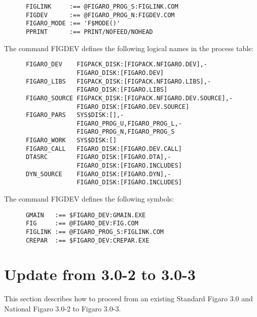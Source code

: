 \begin{verbatim}
      FIGLINK     :== @FIGARO_PROG_S:FIGLINK.COM
      FIGDEV      :== @FIGARO_PROG_N:FIGDEV.COM
      FIGARO_MODE :== 'F$MODE()'
      PPRINT      :== PRINT/NOFEED/NOHEAD
\end{verbatim}

The command FIGDEV defines the following logical names in the process table:

\begin{verbatim}
      FIGARO_DEV    FIGPACK_DISK:[FIGPACK.NFIGARO.DEV],-
                    FIGARO_DISK:[FIGARO.DEV]
      FIGARO_LIBS   FIGPACK_DISK:[FIGPACK.NFIGARO.LIBS],-
                    FIGARO_DISK:[FIGARO.LIBS]
      FIGARO_SOURCE FIGPACK_DISK:[FIGPACK.NFIGARO.DEV.SOURCE],-
                    FIGARO_DISK:[FIGARO.DEV.SOURCE]
      FIGARO_PARS   SYS$DISK:[],-
                    FIGARO_PROG_U,FIGARO_PROG_L,-
                    FIGARO_PROG_N,FIGARO_PROG_S
      FIGARO_WORK   SYS$DISK:[]
      FIGARO_CALL   FIGARO_DISK:[FIGARO.DEV.CALL]
      DTASRC        FIGARO_DISK:[FIGARO.DTA],-
                    FIGARO_DISK:[FIGARO.INCLUDES]
      DYN_SOURCE    FIGARO_DISK:[FIGARO.DYN],-
                    FIGARO_DISK:[FIGARO.INCLUDES]
\end{verbatim}

The command FIGDEV defines the following symbols:

\begin{verbatim}
      GMAIN   :== $FIGARO_DEV:GMAIN.EXE
      FIG     :== @FIGARO_DEV:FIG.COM
      FIGLINK :== @FIGARO_PROG_S:FIGLINK.COM
      CREPAR  :== $FIGARO_DEV:CREPAR.EXE
\end{verbatim}

\section{Update from 3.0-2 to 3.0-3}
\label{update}

This section describes how to proceed from an existing Standard
Figaro 3.0 and National Figaro 3.0-2 to Figaro 3.0-3.

